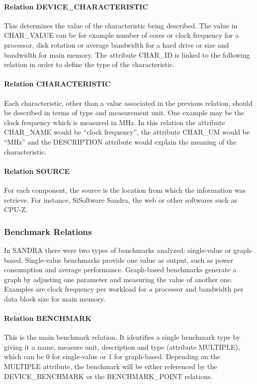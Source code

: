         \paragraph*{Relation DEVICE\_CHARACTERISTIC}
            This determines the value of the characteristic being described. The value in CHAR\_VALUE can be for example number of cores or clock frequency for a processor, disk rotation or average bandwidth for a hard drive or size and bandwidth for main memory. The attribute CHAR\_ID is linked to the following relation in order to define the type of the characteristic.
            
        \paragraph*{Relation CHARACTERISTIC}
            Each characteristic, other than a value associated in the previous relation, should be described in terms of type and measurement unit. One example may be the clock frequency which is measured in MHz. In this relation the attribute CHAR\_NAME would be ``clock frequency'', the attribute CHAR\_UM would be ``MHz'' and the DESCRIPTION attribute would explain the meaning of the characteristic.
            
        \paragraph*{Relation SOURCE}
            For each component, the source is the location from which the information was retrieve. For instance, SiSoftware Sandra, the web or other softwares such as CPU-Z.
            
    \subsubsection*{Benchmark Relations}
        In SANDRA there were two types of benchmarks analyzed: single-value or graph-based. Single-value benchmarks provide one value as output, such as power consumption and average performance. Graph-based benchmarks generate a graph by adjusting one parameter and measuring the value of another one. Examples are clock frequency per workload for a processor and bandwidth per data block size for main memory.

        \paragraph*{Relation BENCHMARK}
            This is the main benchmark relation. It identifies a single benchmark type by giving it a name, measure unit, description and type (attribute MULTIPLE), which can be 0 for single-value or 1 for graph-based. Depending on the MULTIPLE attribute, the benchmark will be either referenced by the DEVICE\_BENCHMARK or the BENCHMARK\_POINT relations.


